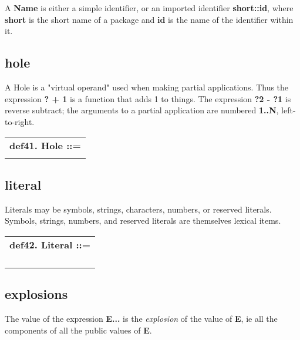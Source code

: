 \documentclass{report}
\begin{document}
A {\bf Name} is either a simple identifier, or an imported identifier
{\bf short::id}, where {\bf short} is the short name of a package and {\bf id} is
the name of the identifier within it.

\subsection{hole}


A Hole is a "virtual operand" used when making partial applications.
Thus the expression {\bf ? + 1} is a function that adds 1 to things. The
expression {\bf ?2 - ?1} is reverse subtract; the arguments to a partial
application are numbered {\bf 1..N}, left-to-right.

\begin{tabular}{l}
{\bf def41. Hole ::= }\\ 
\hspace*{3mm}{\tt "?" {[}(Integer){]}} \\ 
\end{tabular}



\subsection{literal}


Literals may be symbols, strings, characters, numbers, or reserved
literals. Symbols, strings, numbers, and reserved literals are
themselves lexical items.

\begin{tabular}{l}
{\bf def42. Literal ::= }\\ 
\hspace*{3mm}{\tt StringLiteral} \\ 
\hspace*{3mm}{\tt  $\mid$ NumberLiteral} \\ 
\hspace*{3mm}{\tt  $\mid$ ReservedLiteral} \\ 
\hspace*{3mm}{\tt  $\mid$ CharacterLiteral} \\ 
\end{tabular}



\subsection{explosions}


The value of the expression {\bf E...} is the {\em explosion} of the value of {\bf E}, ie
all the components of all the public values of {\bf E}.
\end{document}
